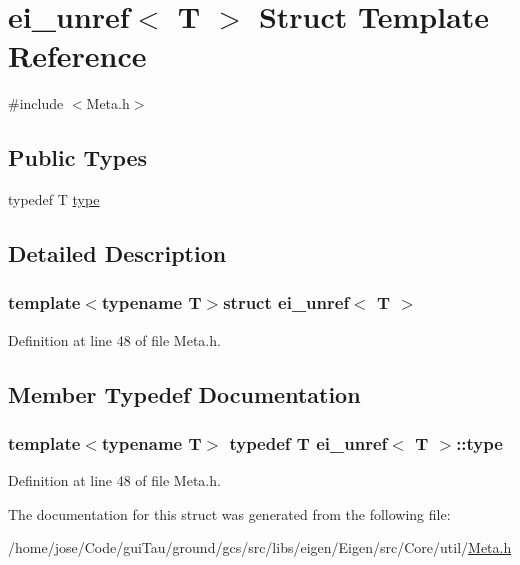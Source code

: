 \hypertarget{structei__unref}{\section{ei\-\_\-unref$<$ T $>$ Struct Template Reference}
\label{structei__unref}
}


{\ttfamily \#include $<$Meta.\-h$>$}

\subsection*{Public Types}
\begin{DoxyCompactItemize}
\item 
typedef T \hyperlink{structei__unref_a774c3365842e8b6f159494186e243b35}{type}
\end{DoxyCompactItemize}


\subsection{Detailed Description}
\subsubsection*{template$<$typename T$>$struct ei\-\_\-unref$<$ T $>$}



Definition at line 48 of file Meta.\-h.



\subsection{Member Typedef Documentation}
\hypertarget{structei__unref_a774c3365842e8b6f159494186e243b35}{
\subsubsection[{type}]{\setlength{\rightskip}{0pt plus 5cm}template$<$typename T$>$ typedef T {\bf ei\-\_\-unref}$<$ T $>$\-::{\bf type}}}\label{structei__unref_a774c3365842e8b6f159494186e243b35}


Definition at line 48 of file Meta.\-h.



The documentation for this struct was generated from the following file\-:\begin{DoxyCompactItemize}
\item 
/home/jose/\-Code/gui\-Tau/ground/gcs/src/libs/eigen/\-Eigen/src/\-Core/util/\hyperlink{_meta_8h}{Meta.\-h}\end{DoxyCompactItemize}
